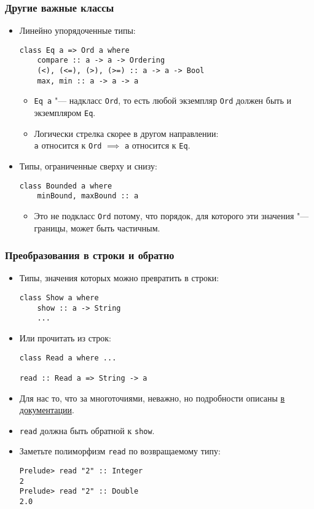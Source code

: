 \documentclass[10pt]{beamer}
\begin{document}
\begin{frame}[fragile]
\frametitle{Другие важные классы}
\begin{itemize}
\item 
Линейно упорядоченные типы:
\begin{lstlisting}
class Eq a => Ord a where
    compare :: a -> a -> Ordering
    (<), (<=), (>), (>=) :: a -> a -> Bool 
    max, min :: a -> a -> a
\end{lstlisting}
    \begin{itemize}
    \item \lstinline|Eq a| "--- надкласс \lstinline|Ord|, то есть любой экземпляр \lstinline|Ord| должен быть и экземпляром \lstinline|Eq|. \pause
    \item Логически стрелка скорее в другом направлении:\\ \lstinline|a| относится к \lstinline|Ord| $\implies$ \lstinline|a| относится к \lstinline|Eq|.
    \end{itemize}
\pause
\item 
Типы, ограниченные сверху и снизу:
\begin{lstlisting}
class Bounded a where
    minBound, maxBound :: a 
\end{lstlisting}
    \begin{itemize}
    \item Это не подкласс \lstinline|Ord| потому, что порядок, для которого эти значения "--- границы, может быть частичным.
    \end{itemize}
\end{itemize}
\end{frame}

\begin{frame}[fragile]
\frametitle{Преобразования в строки и обратно}
\begin{itemize}
    \item 
    Типы, значения которых можно превратить в строки:
\begin{lstlisting}[basicstyle=\ttfamily\small]
class Show a where
    show :: a -> String 
    ...
\end{lstlisting}\pause
\item Или прочитать из строк:
\begin{lstlisting}[basicstyle=\ttfamily\small]
class Read a where ...

read :: Read a => String -> a
\end{lstlisting}\pause
    \item Для нас то, что за многоточиями, неважно, но подробности описаны \href{http://hackage.haskell.org/package/base-4.10.1.0/docs/Prelude.html#g:22}{в документации}.\pause
    \item \lstinline|read| должна быть обратной к \lstinline|show|.
    \item Заметьте полиморфизм \lstinline|read| по возвращаемому типу:
\begin{lstlisting}[basicstyle=\ttfamily\small]
Prelude> read "2" :: Integer
2
Prelude> read "2" :: Double
2.0
\end{lstlisting}
\end{itemize}
\end{frame}
\end{document}
